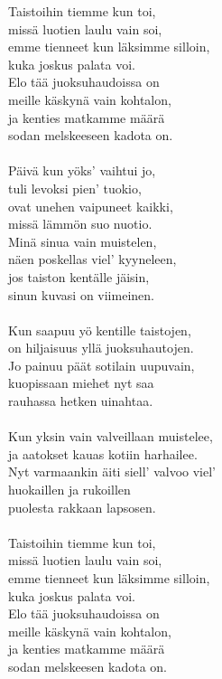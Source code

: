 
            Taistoihin tiemme kun toi, \\
            missä luotien laulu vain soi, \\
            emme tienneet kun läksimme silloin, \\
            kuka joskus palata voi. \\
            Elo tää juoksuhaudoissa on \\
            meille käskynä vain kohtalon, \\
            ja kenties matkamme määrä \\
            sodan melskeeseen kadota on. \\
\hspace{10mm} \\
            Päivä kun yöks’ vaihtui jo, \\
            tuli levoksi pien’ tuokio, \\
            ovat unehen vaipuneet kaikki, \\
            missä lämmön suo nuotio. \\
            Minä sinua vain muistelen, \\
            näen poskellas viel’ kyyneleen, \\
            jos taiston kentälle jäisin, \\
            sinun kuvasi on viimeinen. \\
\hspace{10mm} \\
            Kun saapuu yö kentille taistojen, \\
            on hiljaisuus yllä juoksuhautojen. \\
            Jo painuu päät sotilain uupuvain, \\
            kuopissaan miehet nyt saa \\
            rauhassa hetken uinahtaa. \\
\hspace{10mm} \\
            Kun yksin vain valveillaan muistelee, \\
            ja aatokset kauas kotiin harhailee. \\
            Nyt varmaankin äiti siell’ valvoo viel’ \\
            huokaillen ja rukoillen \\
            puolesta rakkaan lapsosen. \\
\hspace{10mm} \\
            Taistoihin tiemme kun toi, \\
            missä luotien laulu vain soi, \\
            emme tienneet kun läksimme silloin, \\
            kuka joskus palata voi. \\
            Elo tää juoksuhaudoissa on \\
            meille käskynä vain kohtalon, \\
            ja kenties matkamme määrä \\
            sodan melskeesen kadota on. \\
